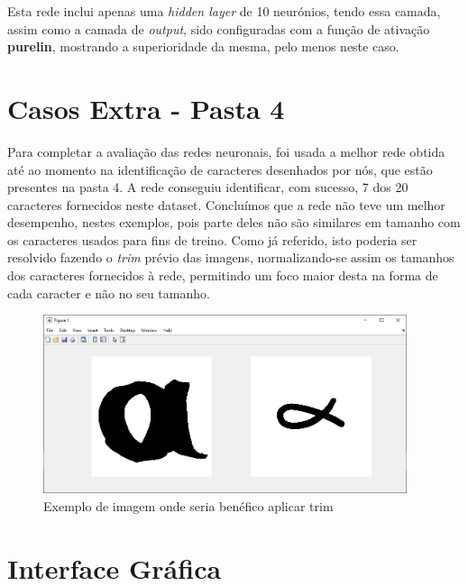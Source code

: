 \documentclass[11pt]{article}
\begin{document}
	Esta rede inclui apenas uma \textit{hidden layer} de 10 neurónios, tendo essa camada, assim como a camada de \textit{output}, sido configuradas com a função de ativação \textbf{purelin}, mostrando a superioridade da mesma, pelo menos neste caso.
	
	\large
	\section{Casos Extra - Pasta 4}
	\normalsize
	
	Para completar a avaliação das redes neuronais, foi usada a melhor rede obtida até ao momento na identificação de caracteres desenhados por nós, que estão presentes na pasta 4. A rede conseguiu identificar, com sucesso, 7 dos 20 caracteres fornecidos neste dataset. Concluímos que a rede não teve um melhor desempenho, nestes exemplos, pois parte deles não são similares em tamanho com os caracteres usados para fins de treino. Como já referido, isto poderia ser resolvido fazendo o \textit{trim} prévio das imagens, normalizando-se assim os tamanhos dos caracteres fornecidos à rede, permitindo um foco maior desta na forma de cada caracter e não no seu tamanho.
	
	\begin{figure}[H]
		\includegraphics[width=0.95\textwidth,height=0.88\textheight,keepaspectratio]{matlab-trim}
		\centering
		\caption{Exemplo de imagem onde seria benéfico aplicar trim}
		\label{fig:trim}
	\end{figure}
	
	
	\large
	\section{Interface Gráfica}
	\normalsize
	
\end{document}
